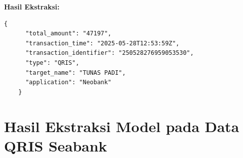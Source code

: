 \textbf{Hasil Ekstraksi:}
\begin{lstlisting}[style=jsonstyle]
    {
      "total_amount": "47197",
      "transaction_time": "2025-05-28T12:53:59Z",
      "transaction_identifier": "250528276959053530",
      "type": "QRIS",
      "target_name": "TUNAS PADI",
      "application": "Neobank"
    }
\end{lstlisting}

\clearpage

\section{Hasil Ekstraksi Model pada Data QRIS Seabank}

\begin{table}[h!]
    \centering
    \begin{tabularx}{\textwidth}{m{} X}

\end{tabularx}
\end{table}
